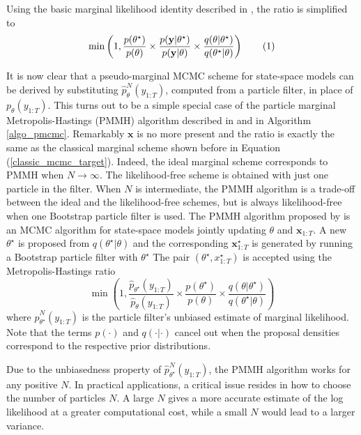 \documentclass[11pt,a4,twosided,singlespacing,titlepagenumber=on]{scrreprt}
\numberwithin{equation}{chapter} %
\theoremstyle{remark}
\newcommand{\matr}[1]{\mathbf{#1}}
\newcommand\numberthis{\addtocounter{equation}{1}\tag{\theequation}}
\begin{document}
Using the basic marginal likelihood identity described in \cite{chib1995}, the ratio is simplified to
\begin{align*}
 \min \left(1, \frac{p(\theta^\star)}{p(\theta)}  \times \frac{p(\matr{y}|\theta^\star)}{p(\matr{y}|\theta)} \times \frac{q(\theta|\theta^\star)}{q(\theta^\star|\theta)} \right) \numberthis
\end{align*}

It is now clear that a pseudo-marginal MCMC scheme for state-space models can be derived by substituting $\hat{p}^N_{\theta}(y_{1:T})$, computed from a particle filter, in place of $p_{\theta}(y_{1:T})$. This turns out to be a simple special case of the particle marginal Metropolis-Hastings (PMMH) algorithm described in \cite{andrieu2010} and in Algorithm \ref{algo_pmcmc}. Remarkably $\matr{x}$ is no more present and the ratio is exactly the same as the classical marginal scheme shown before in Equation (\ref{classic_mcmc_target}). Indeed, the ideal marginal scheme corresponds to PMMH when $N \rightarrow \infty$. The likelihood-free scheme is obtained with just one particle in the filter. When $N$ is intermediate, the PMMH algorithm is a trade-off between the ideal and the likelihood-free schemes, but is always likelihood-free when one Bootstrap particle filter is used. The PMMH algorithm proposed by \cite{andrieu2010} is an MCMC algorithm for state-space models jointly updating $\theta$ and $\matr{x}_{1:T}$. A new $\theta^\star$ is proposed from $q(\theta^\star|\theta)$  and the corresponding $\matr{x}_{1:T}^\star$ is generated by running a Bootstrap particle filter with $\theta^\star$ The pair $(\theta^\star,x_{1:T}^\star)$ is accepted using the Metropolis-Hastings ratio
\begin{equation}
\min \left(1, \frac{\hat{p}_{\theta^\star}(y_{1:T})}{\hat{p}_{\theta}(y_{1:T})} \times \frac{p(\theta^\star)}{p(\theta)} \times \frac{q(\theta|\theta^\star)}{q(\theta^\star|\theta)} \right)
\end{equation} 
where $\hat{p}^N_{\theta^\star}(y_{1:T})$ is the particle filter's unbiased estimate of marginal likelihood. Note that the terms $p(\cdot)$ and $q(\cdot|\cdot)$ cancel out when the proposal densities correspond to the respective prior distributions.

Due to the unbiasedness property of $\hat{p}^N_{\theta^\star}(y_{1:T})$, the PMMH algorithm works for any positive $N$. In practical applications, a critical issue resides in how to choose the number of particles $N$. A large $N$ gives a more accurate estimate of the log likelihood at a greater computational cost, while a small $N$ would lead to a larger variance.
\end{document}
